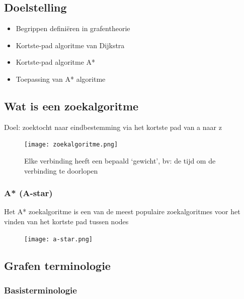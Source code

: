 \documentclass{article}
\begin{document}
\subsection{Doelstelling}

\begin{itemize}
    \item Begrippen definiëren in grafentheorie
    \item Kortste-pad algoritme van Dijkstra
    \item Kortste-pad algoritme A*
    \item Toepassing van A* algoritme
\end{itemize}

\subsection{Wat is een zoekalgoritme}

Doel: zoektocht naar eindbestemming via het kortste pad van a naar z

\begin{figure}[H]
    \centering
    \texttt{[image: zoekalgoritme.png]}
    \caption{Elke verbinding heeft een bepaald `gewicht', bv: de tijd om de verbinding te doorlopen}
\end{figure}

\subsubsection{A* (A-star)}

Het A* zoekalgoritme is een van de meest populaire zoekalgoritmes voor 
het vinden van het kortste pad tussen nodes

\begin{figure}[H]
    \centering
    \texttt{[image: a-star.png]}
\end{figure}

\subsection{Grafen terminologie}

\subsubsection{Basisterminologie}
\end{document}
